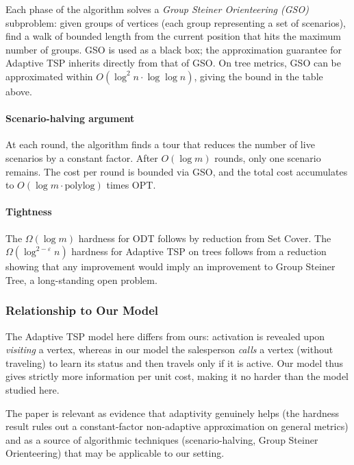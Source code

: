 Each phase of the algorithm solves a \emph{Group Steiner Orienteering (GSO)} subproblem: given groups of vertices (each group representing a set of scenarios), find a walk of bounded length from the current position that hits the maximum number of groups. GSO is used as a black box; the approximation guarantee for Adaptive TSP inherits directly from that of GSO. On tree metrics, GSO can be approximated within $O(\log^2 n \cdot \log \log n)$, giving the bound in the table above.

\paragraph{Scenario-halving argument}

At each round, the algorithm finds a tour that reduces the number of live scenarios by a constant factor. After $O(\log m)$ rounds, only one scenario remains. The cost per round is bounded via GSO, and the total cost accumulates to $O(\log m \cdot \mathrm{polylog})$ times OPT.

\paragraph{Tightness}

The $\Omega(\log m)$ hardness for ODT follows by reduction from Set Cover. The $\Omega(\log^{2-\varepsilon} n)$ hardness for Adaptive TSP on trees follows from a reduction showing that any improvement would imply an improvement to Group Steiner Tree, a long-standing open problem.

\subsubsection{Relationship to Our Model}

The Adaptive TSP model here differs from ours: activation is revealed upon \emph{visiting} a vertex, whereas in our model the salesperson \emph{calls} a vertex (without traveling) to learn its status and then travels only if it is active. Our model thus gives strictly more information per unit cost, making it no harder than the model studied here.

The paper is relevant as evidence that adaptivity genuinely helps (the hardness result rules out a constant-factor non-adaptive approximation on general metrics) and as a source of algorithmic techniques (scenario-halving, Group Steiner Orienteering) that may be applicable to our setting.
